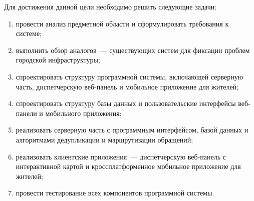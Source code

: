 Для достижения данной цели необходимо решить следующие задачи:
\begin{enumerate}
    \item провести анализ предметной области и сформулировать требования к системе;
    \item выполнить обзор аналогов~--- существующих систем для фиксации проблем
          городской инфраструктуры;
    \item спроектировать структуру программной системы, включающей серверную часть,
          диспетчерскую веб-панель и мобильное приложение для жителей;
    \item спроектировать структуру базы данных и пользовательские интерфейсы
          веб-панели и мобильного приложения;
    \item реализовать серверную часть с программным интерфейсом, базой данных
          и алгоритмами дедупликации и маршрутизации обращений;
    \item реализовать клиентские приложения~--- диспетчерскую веб-панель с интерактивной
          картой и кроссплатформенное мобильное приложение для жителей;
    \item провести тестирование всех компонентов программной системы.
\end{enumerate}
